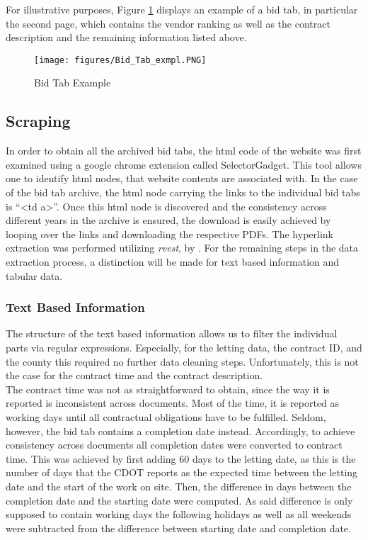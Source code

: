 \documentclass[a4paper,12pt, headsepline]{scrartcl}
\numberwithin{equation}{section}
\begin{document}
For illustrative purposes, Figure \ref{fig:bidtab} displays an example of a bid tab, in particular the second page, which contains the vendor ranking as well as the contract description and the remaining information listed above.

\begin{figure}[H]
	\texttt{[image: figures/Bid\_Tab\_exmpl.PNG]}
	\caption{Bid Tab Example}\label{fig:bidtab}
\end{figure}

\subsection{Scraping}\label{subsec:scrap}
In order to obtain all the archived bid tabs, the html code of the website was first examined using a google chrome extension called SelectorGadget. This tool allows one to identify html nodes, that website contents are associated with. In the case of the bid tab archive, the html node carrying the links to the individual bid tabs is \enquote{<td a>}. Once this html node is discovered and the consistency across different years in the archive is ensured, the download is easily achieved by looping over the links and downloading the  respective PDFs. The hyperlink extraction was performed utilizing \textit{rvest}, by \citet{rvest}. For the remaining steps in the data extraction process, a distinction will be made for text based information and tabular data.

\subsubsection{Text Based Information}\label{subsubsec:descr}
 The structure of the text based information allows us to filter the individual parts via regular expressions. Especially, for the letting data, the contract ID, and the county this required no further data cleaning steps. Unfortunately, this is not the case for the contract time and the contract description.\\ 
 The contract time was not as straightforward to obtain, since the way it is reported is inconsistent across documents. Most of the time, it is reported as working days until all contractual obligations have to be fulfilled. Seldom, however, the bid tab contains a completion date instead. Accordingly, to achieve consistency across documents all completion dates were converted to contract time. This was achieved by first adding 60 days to the letting date, as this is the number of days that the CDOT reports as the expected time between the letting date and the start of the work on site. Then, the difference in days between the completion date and the starting date were computed. As said difference is only supposed to contain working days the following holidays as well as all weekends were subtracted from the difference between starting date and completion date.
 
\end{document}
